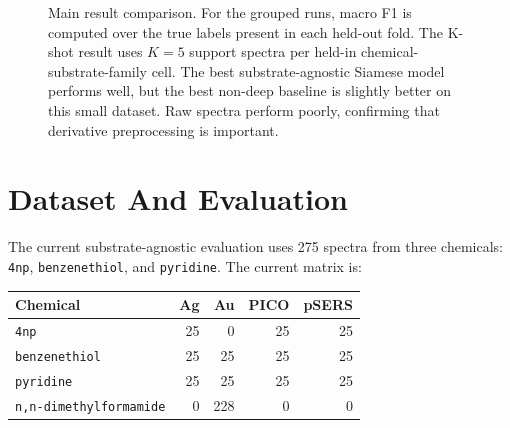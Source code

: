 \documentclass[11pt]{article}
\begin{document}
\begin{figure}[ht]
\centering
{}
\caption{Main result comparison. For the grouped runs, macro F1 is computed over the true labels present in each held-out fold. The K-shot result uses $K=5$ support spectra per held-in chemical-substrate-family cell. The best substrate-agnostic Siamese model performs well, but the best non-deep baseline is slightly better on this small dataset. Raw spectra perform poorly, confirming that derivative preprocessing is important.}
\end{figure}

\section*{Dataset And Evaluation}

The current substrate-agnostic evaluation uses 275 spectra from three chemicals: \texttt{4np}, \texttt{benzenethiol}, and \texttt{pyridine}. The current matrix is:

\begin{center}
\begin{tabular}{lrrrr}
\toprule
\textbf{Chemical} & \textbf{Ag} & \textbf{Au} & \textbf{PICO} & \textbf{pSERS} \\
\midrule
\texttt{4np} & 25 & 0 & 25 & 25 \\
\texttt{benzenethiol} & 25 & 25 & 25 & 25 \\
\texttt{pyridine} & 25 & 25 & 25 & 25 \\
\texttt{n,n-dimethylformamide} & 0 & 228 & 0 & 0 \\
\bottomrule
\end{tabular}
\end{center}
\end{document}
